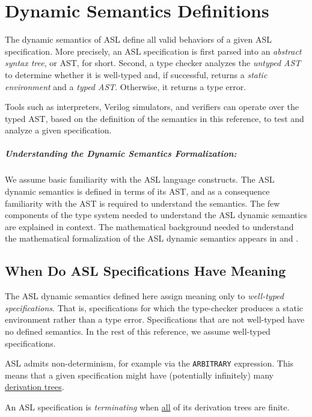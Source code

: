 \chapter{Dynamic Semantics Definitions\label{chap:Semantics}}

The dynamic semantics of ASL define all valid behaviors of a given ASL specification.
More precisely, an ASL specification is first parsed into an \emph{abstract syntax tree},
or AST, for short. Second, a type checker analyzes the \emph{untyped AST} to determine whether it
is well-typed and, if successful, returns a \emph{static environment} and a \emph{typed AST}.
Otherwise, it returns a type error.

Tools such as interpreters, Verilog simulators, and verifiers can operate over the typed AST, based on the definition
of the semantics in this reference, to test and analyze a given specification.

\paragraph{Understanding the Dynamic Semantics Formalization:}
We assume basic familiarity with the ASL language constructs.
The ASL dynamic semantics is defined in terms of its AST,
and as a consequence familiarity with the AST is required to understand the semantics.
The few components of the type system needed to understand the ASL dynamic semantics are explained in context.
The mathematical background needed to understand the mathematical formalization
of the ASL dynamic semantics appears in  and .

\section{When Do ASL Specifications Have Meaning\label{sec:MeaningfulASLSpecifications}}
The ASL dynamic semantics defined here assign meaning only to \emph{well-typed specifications}.
That is, specifications for which the type-checker produces a static environment rather than
a type error.
Specifications that are not well-typed have no defined semantics.
In the rest of this reference, we assume well-typed specifications.

ASL admits non-determinism, for example via the \texttt{ARBITRARY} expression.
This means that a given specification might have (potentially infinitely) many
\hyperlink{def-derivationtree}{derivation trees}.

An ASL specification is \emph{terminating} when \underline{all} of its derivation trees are finite.

